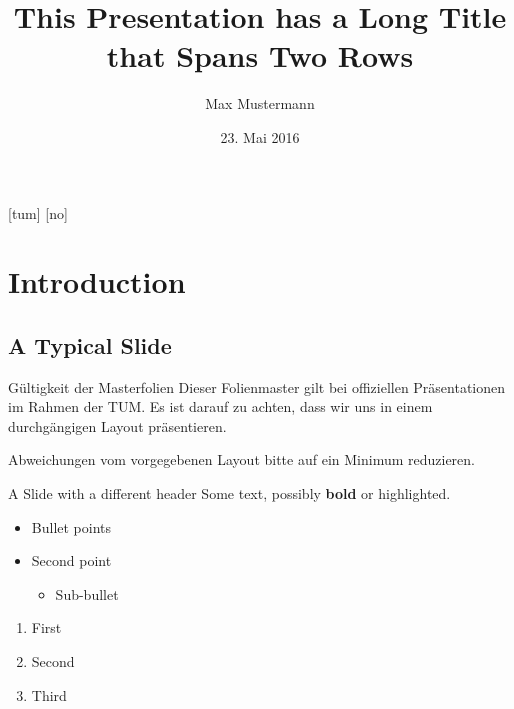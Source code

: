 \documentclass[10pt,t]{beamer}
\title{This Presentation has a Long Title that Spans Two Rows}
\author[Max Mustermann (TUM)]{Max Mustermann}
\institute{\MSVname}
\date{23. Mai 2016}
\begin{document}
{ %
[tum]
[no]
\begin{frame}
\titlepage
\end{frame}
}

\section{Introduction}
\subsection{A Typical Slide}

\begin{frame}{Gültigkeit der Masterfolien}
Dieser Folienmaster gilt bei offiziellen Präsentationen im Rahmen der TUM. Es ist darauf zu achten,
dass wir uns in einem durchgängigen Layout präsentieren.

\bigskip %

Abweichungen vom vorgegebenen Layout bitte auf ein Minimum reduzieren.
\end{frame}

{
\begin{frame}{A Slide with a different header}
Some text, possibly \textbf{bold} or \alert{highlighted}.

\begin{itemize}
\item Bullet points
\item Second point
\begin{itemize}
\item Sub-bullet
\end{itemize}
\end{itemize}

\pause
\begin{enumerate}
\item First
\item Second
\item Third
\end{enumerate}

\end{frame}
}
\end{document}
